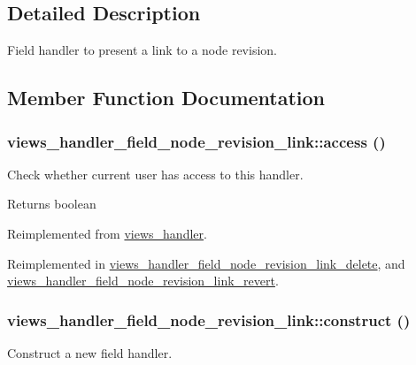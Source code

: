 \subsection{Detailed Description}
Field handler to present a link to a node revision. 

\subsection{Member Function Documentation}
\hypertarget{classviews__handler__field__node__revision__link_a29923ca97bbff1c87c0e9338ec972a07}{
\subsubsection[{access}]{\setlength{\rightskip}{0pt plus 5cm}views\_\-handler\_\-field\_\-node\_\-revision\_\-link::access ()}}
\label{classviews__handler__field__node__revision__link_a29923ca97bbff1c87c0e9338ec972a07}
Check whether current user has access to this handler.

\begin{DoxyReturn}{Returns}
boolean 
\end{DoxyReturn}


Reimplemented from \hyperlink{classviews__handler_a3f2fbfe1e0849d06ae77149412b821f6}{views\_\-handler}.

Reimplemented in \hyperlink{classviews__handler__field__node__revision__link__delete_a8d1e660c4945e837ced26d6f12a6521e}{views\_\-handler\_\-field\_\-node\_\-revision\_\-link\_\-delete}, and \hyperlink{classviews__handler__field__node__revision__link__revert_a6cb6e683478e55b9e3e64602dbc8886d}{views\_\-handler\_\-field\_\-node\_\-revision\_\-link\_\-revert}.\hypertarget{classviews__handler__field__node__revision__link_abebde82066efb55992015fcd460027ff}{
\subsubsection[{construct}]{\setlength{\rightskip}{0pt plus 5cm}views\_\-handler\_\-field\_\-node\_\-revision\_\-link::construct ()}}
\label{classviews__handler__field__node__revision__link_abebde82066efb55992015fcd460027ff}
Construct a new field handler. 

